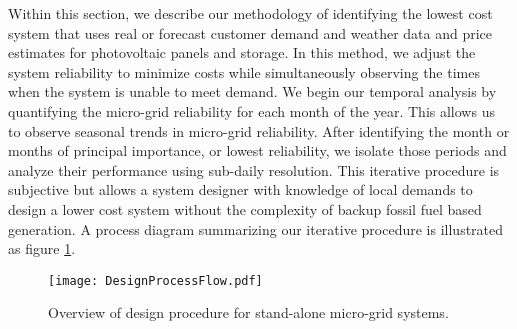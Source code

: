 \documentclass[11p]{article}
\begin{document}

Within this section, we describe our methodology of identifying the lowest cost system that uses real or forecast customer demand and weather data and price estimates for photovoltaic panels and storage.
In this method, we adjust the system reliability to minimize costs while simultaneously observing the times when the system is unable to meet demand.  
We begin our temporal analysis by quantifying the micro-grid reliability for each month of the year. 
This allows us to observe seasonal trends in micro-grid reliability. 
After identifying the month or months of principal importance, or lowest reliability, we isolate those periods and analyze their performance using sub-daily resolution. 
This iterative procedure is subjective but allows a system designer with knowledge of local demands to design a lower cost system without the complexity of backup fossil fuel based generation.
A process diagram summarizing our iterative procedure is illustrated as figure \ref{FlowChart}. 


\begin{figure}
\centering
\texttt{[image: DesignProcessFlow.pdf]}
\caption{Overview of design procedure for stand-alone micro-grid systems.}

\label{FlowChart}
\end{figure}
\end{document}
